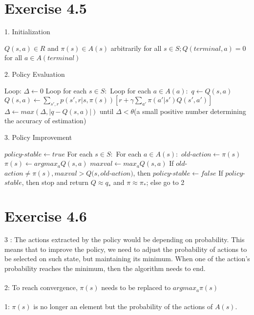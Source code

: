 \documentclass{report}
\begin{document}
\section*{Exercise 4.5}
1. Initialization 
\begin{algorithmic}
\State $ Q(s,a) \in R$ and $\pi(s) \in A(s)$ arbitrarily for all $s \in S; Q(terminal, a)=0$ for all $a \in A(terminal)$
\end{algorithmic}
2. Policy Evaluation
\begin{algorithmic}
\State Loop:
\Indent
    \State $\Delta \leftarrow 0$
    \State Loop for each $s\in S:$
    \Indent
        \State Loop for each $a \in A(a):$
        \Indent
            \State $q \leftarrow Q(s, a)$
            \State $Q(s,a) \leftarrow \sum_{s',r}^{}p(s',r|s,\pi(s))[r+\gamma \sum_{a'}\pi(a'|s')Q(s',a')]$
            \State $\Delta \leftarrow max(\Delta,\left| q-Q(s,a) \right|)$
        \EndIndent
    \EndIndent
    \State until $\Delta < \theta$(a small positive number determining the accuracy of estimation)
\EndIndent
\end{algorithmic}
3. Policy Improvement
\begin{algorithmic}
\State $policy$-$stable \leftarrow true$
\State For each $s \in S:$
\Indent
    \State For each $a \in A(s):$
    \Indent
        \State $old$-$action \leftarrow \pi(s)$
        \State $\pi(s) \leftarrow argmax_a Q(s,a)$
        \State $maxval \leftarrow max_a Q(s,a)$
        \State If $old$-$action \neq \pi(s), maxval>Q(s, old$-$action) $, then $policy$-$stable \leftarrow false$
    \EndIndent 
\EndIndent
\State If $policy$-$stable$, then stop and return $Q \approx q_*$ and $\pi \approx \pi_*$; else go to 2
\end{algorithmic}

\section*{Exercise 4.6}
3 : The actions extracted by the policy would be depending on probability. This means that to improve the policy, we need to adjust the probability of actions to be selected on such state, but maintaining its minimum. When one of the action's probability reaches the minimum, then the algorithm needs to end.\\\\
2: To reach convergence, $\pi(s)$ needs to be replaced to $ argmax_a\pi(s)$\\\\
1: $\pi(s)$ is no longer an element but the probability of the actions of $A(s)$.
\end{document}
